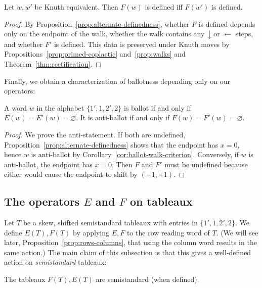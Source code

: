 \documentclass[ALCO,ThmDefs,Unicode,epreuves]{cedram}
\newcommand{\west}[1]{\ensuremath{\xleftarrow{\ #1\ }}}
\newcommand{\south}[1]{\ensuremath{\big \downarrow \!\text{\raisebox{.1ex}{\scriptsize $#1$}}}}
\begin{document}
\begin{coro} \label{cor:Fdefinedness-knuth}
Let $w, w'$ be Knuth equivalent. Then $F(w)$ is defined iff $F(w')$ is defined.
\end{coro}

\begin{proof}
By Proposition~\ref{prop:alternate-definedness}, whether $F$ is defined depends only on the endpoint of the walk, whether the walk contains any $\south{}$ or $\west{}$ steps, and whether $F'$ is defined. This data is preserved under Knuth moves by Propositions~\ref{prop:primed-coplactic} and~\ref{prop:walks} and Theorem~\ref{thm:rectification}.
\end{proof}

Finally, we obtain a characterization of ballotness depending only on our operators:

\begin{prop} \label{prop:ballot-iff-killed}
A word $w$ in the alphabet $\{1',1,2',2\}$ is ballot if and only if $E(w) = E'(w) = \varnothing$. It is anti-ballot if and only if $F(w) = F'(w) = \varnothing$.
\end{prop}

\begin{proof}
We prove the anti-statement. If both are undefined, Proposition~\ref{prop:alternate-definedness} shows that the endpoint has $x=0$, hence $w$ is anti-ballot by Corollary~\ref{cor:ballot-walk-criterion}. Conversely, if $w$ is anti-ballot, the endpoint has $x=0$. Then $F$ and $F'$ must be undefined because either would cause the endpoint to shift by $(-1,+1)$.
\end{proof}

\subsection{The operators \texorpdfstring{$E$}{E} and \texorpdfstring{$F$}{F} on tableaux}

Let $T$ be a skew, shifted semistandard tableaux with entries in $\{1',1,2',2\}$. We define $E(T), F(T)$ by applying $E,F$ to the row reading word of $T$. (We will see later, Proposition~\ref{prop:rows-columns}, that using the column word results in the same action.) The main claim of this subsection is that this gives a well-defined action on \emph{semistandard} tableaux:

\begin{theorem} \label{thm:FE-semistandard}
The tableaux $F(T), E(T)$ are semistandard \textup{(}when defined\textup{)}.
\end{theorem}
\end{document}
